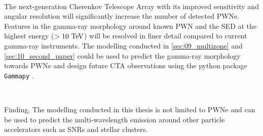 \par~\par
The next-generation Cherenkov Telescope Array with its improved sensitivity and angular resolution \citep{2019scta.book.....C} will significantly increase the number of detected PWNe. Features in the gamma-ray morphology around known PWN and the SED at the highest energy ($>10~\TeV$) will be resolved in finer detail compared to current gamma-ray instruments. The modelling conducted in \autoref{sec:09_multizone} and \autoref{sec:10_second_paper} could be used to predict the gamma-ray morphology towards PWNe and design future CTA observations using the python package {\tt Gammapy} \citep{gammapy:2017}.
\par~\par 
Finding, The modelling conducted in this thesis is not limited to PWNe and can be used to predict the multi-wavelength emission around other particle accelerators such as SNRs and stellar clusters.